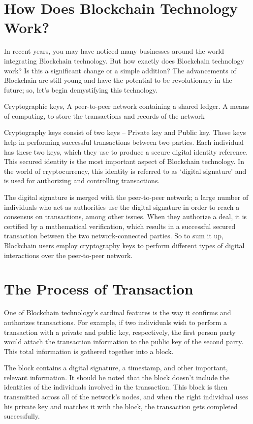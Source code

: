 \documentclass[BTech]{srmuthesis}
\begin{document}
  \section{How Does Blockchain Technology Work?}

  In recent years, you may have noticed many businesses around the world integrating Blockchain technology. But how exactly does Blockchain technology work? Is this a significant change or a simple addition? The advancements of Blockchain are still young and have the potential to be revolutionary in the future; so, let’s begin demystifying this technology.

  Cryptographic keys, A peer-to-peer network containing a shared ledger. A means of computing, to store the transactions and records of the network

  Cryptography keys consist of two keys – Private key and Public key. These keys help in performing successful transactions between two parties. Each individual has these two keys, which they use to produce a secure digital identity reference. This secured identity is the most important aspect of Blockchain technology. In the world of cryptocurrency, this identity is referred to as ‘digital signature’ and is used for authorizing and controlling transactions.

  The digital signature is merged with the peer-to-peer network; a large number of individuals who act as authorities use the digital signature in order to reach a consensus on transactions, among other issues. When they authorize a deal, it is certified by a mathematical verification, which results in a successful secured transaction between the two network-connected parties. So to sum it up, Blockchain users employ cryptography keys to perform different types of digital interactions over the peer-to-peer network.

  \section{The Process of Transaction}
  One of Blockchain technology’s cardinal features is the way it confirms and authorizes transactions. For example, if two individuals wish to perform a transaction with a private and public key, respectively, the first person party would attach the transaction information to the public key of the second party. This total information is gathered together into a block.

  The block contains a digital signature, a timestamp, and other important, relevant information. It should be noted that the block doesn’t include the identities of the individuals involved in the transaction. This block is then transmitted across all of the network's nodes, and when the right individual uses his private key and matches it with the block, the transaction gets completed successfully.
\end{document}
